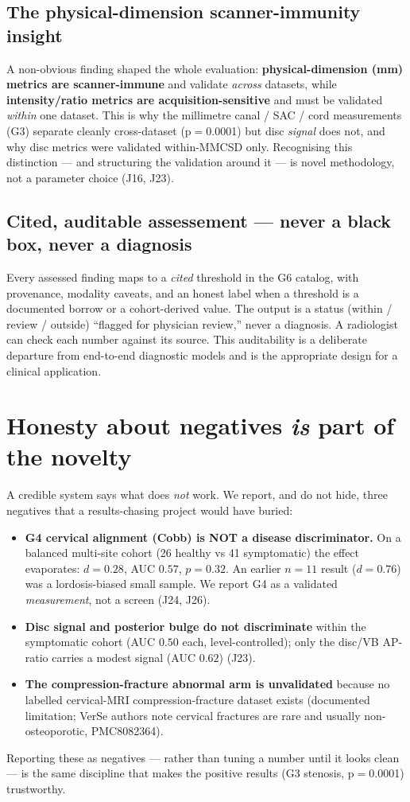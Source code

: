 \documentclass[11pt]{article}
\begin{document}
\subsection{The physical-dimension scanner-immunity insight}
A non-obvious finding shaped the whole evaluation: \textbf{physical-dimension (mm) metrics are
scanner-immune} and validate \emph{across} datasets, while \textbf{intensity/ratio metrics are
acquisition-sensitive} and must be validated \emph{within} one dataset. This is why the millimetre canal
/ SAC / cord measurements (G3) separate cleanly cross-dataset (p$=$0.0001) but disc \emph{signal} does
not, and why disc metrics were validated within-MMCSD only. Recognising this distinction --- and
structuring the validation around it --- is novel methodology, not a parameter choice (J16, J23).

\subsection{Cited, auditable assessement --- never a black box, never a diagnosis}
Every assessed finding maps to a \emph{cited} threshold in the G6 catalog,
with provenance, modality caveats, and an honest label
when a threshold is a documented borrow or a cohort-derived value. The output is a status
(within / review / outside) ``flagged for physician review,'' never a diagnosis. A radiologist can check
each number against its source. This auditability is a deliberate departure from end-to-end
diagnostic models and is the appropriate design for a clinical application.

\section{Honesty about negatives \emph{is} part of the novelty}
A credible system says what does \emph{not} work. We report, and do not hide, three negatives that a
results-chasing project would have buried:
\begin{itemize}
  \item \textbf{G4 cervical alignment (Cobb) is NOT a disease discriminator.} On a balanced multi-site
  cohort (26 healthy vs 41 symptomatic) the effect evaporates: $d=0.28$, AUC $0.57$, $p=0.32$. An earlier
  $n=11$ result ($d=0.76$) was a lordosis-biased small sample. We report G4 as a validated
  \emph{measurement}, not a screen (J24, J26).
  \item \textbf{Disc signal and posterior bulge do not discriminate} within the symptomatic cohort
  (AUC $0.50$ each, level-controlled); only the disc/VB AP-ratio carries a modest signal (AUC $0.62$)
  (J23).
  \item \textbf{The compression-fracture abnormal arm is unvalidated} because no labelled cervical-MRI
  compression-fracture dataset exists (documented limitation; VerSe authors note cervical fractures are
  rare and usually non-osteoporotic, PMC8082364).
\end{itemize}
Reporting these as negatives --- rather than tuning a number until it looks clean --- is the same
discipline that makes the positive results (G3 stenosis, p$=$0.0001) trustworthy.
\end{document}
